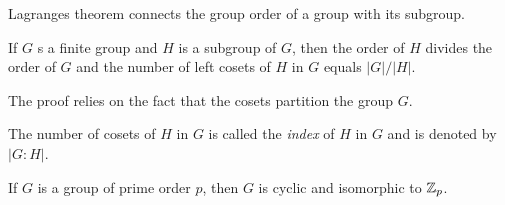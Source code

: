 Lagranges theorem connects the group order of a group with its subgroup.

\begin{theorem}
If $G$ s a finite group and $H$ is a subgroup of $G$, then the order of $H$ divides the order of $G$ and the number of left cosets of $H$ in $G$ equals $|G| / |H|$.	
\end{theorem}

The proof relies on the fact that the cosets partition the group $G$.

The number of cosets of $H$ in $G$ is called the \emph{index} of $H$ in $G$ and is denoted by $|G:H|$.


\begin{theorem}
If $G$ is a group of prime order $p$, then $G$ is cyclic and isomorphic to $\mathbb{Z}_p$.
\end{theorem}


